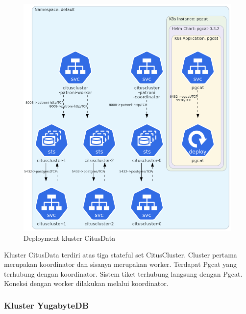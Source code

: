 \begin{figure}[htbp]
    \centering
    \includegraphics[width=1\textwidth]{resources/chapter-4/citusdata.png}
    \caption{Deployment kluster CitusData}
    \label{fig:deployment-citusdata}
\end{figure}

Kluster CitusData terdiri atas tiga stateful set CitusCluster. Cluster pertama merupakan koordinator dan sisanya merupakan worker. Terdapat Pgcat yang terhubung dengan koordinator. Sistem tiket terhubung langsung dengan Pgcat. Koneksi dengan worker dilakukan melalui koordinator.

\pagebreak

\subsubsection{Kluster YugabyteDB}


